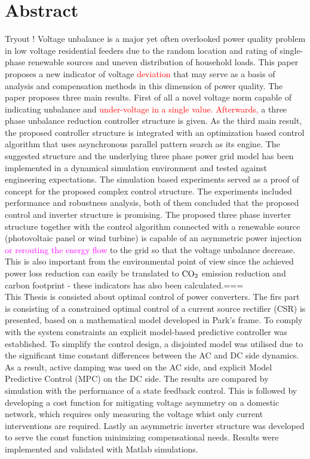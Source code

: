 \chapter*{Abstract}
\thispagestyle{plain}
Tryout \cite{thrift2003space}!
     Voltage unbalance is a major yet often overlooked power quality problem in low voltage residential feeders due to the random location and rating of single-phase renewable sources and uneven distribution of household loads. This paper proposes a new indicator of voltage \textcolor{red}{deviation} that may serve as a basis of analysis and compensation methods in this dimension of power quality. The paper proposes three main results. First of all a novel voltage norm capable of indicating unbalance and \textcolor{red}{under-voltage in a single value. Afterwards,} a three phase unbalance reduction controller structure is given. As the third main result, the proposed controller structure is integrated with an optimization based control algorithm that uses asynchronous parallel pattern search as its engine. The suggested structure and the underlying three phase power grid model has been implemented in a dynamical simulation environment and tested against engineering expectations.
    The simulation based experiments served as a proof of concept for the proposed complex control structure. The experiments included performance and robustness analysis, both of them concluded that the proposed control and inverter structure is promising.
    The proposed three phase inverter structure together with the control algorithm connected with a renewable source (photovoltaic panel or wind turbine) is capable of an asymmetric power injection \textcolor{magenta}{or rerouting the energy flow} to the grid so that the voltage unbalance decrease. This is also important from the environmental point of view since the achieved power loss reduction can easily be translated to $\textnormal{CO}_2$ emission reduction and carbon footprint - these indicators has also been calculated.===\\ 
    This Thesis is consisted about optimal control of power converters. The firs part is consisting of a constrained optimal control of a current source rectifier (CSR) is presented, based on a mathematical model developed in Park's frame. To comply with the system constraints an explicit model-based predictive controller was established. To simplify the control design, a disjointed model was utilised due to the significant time constant differences between the AC and DC side dynamics. As a result, active damping was used on the AC side, and explicit Model Predictive Control (MPC) on the DC side. The results are compared by simulation with the performance of a state feedback control. This is followed by developing a cost function for mitigating voltage asymmetry on a domestic network, which requires only measuring the voltage whist only current interventions are required. Lastly an asymmetric inverter structure was developed to serve the const function minimizing compensational needs. Results were implemented and validated with Matlab simulations.

%


